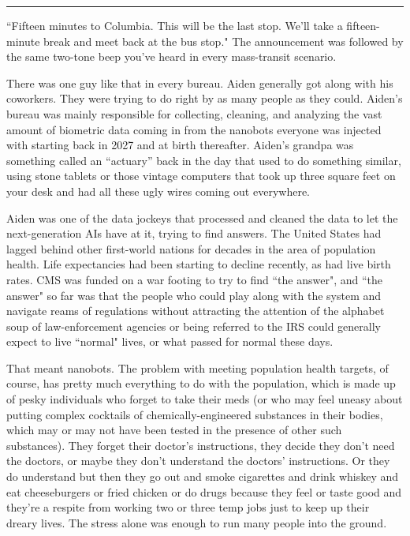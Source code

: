 \documentclass[11pt]{book}
\begin{document}
	\vspace{0.5cm}
	\hrule
	\vspace{0.5cm}
	
	``Fifteen minutes to Columbia. This will be the last stop. We'll take a fifteen-minute break and meet back at the bus stop." The announcement was followed by the same two-tone beep you've heard in every mass-transit scenario.
	
	There was one guy like that in every bureau. Aiden generally got along with his coworkers. They were trying to do right by as many people as they could. Aiden's bureau was mainly responsible for collecting, cleaning, and analyzing the vast amount of biometric data coming in from the nanobots everyone was injected with starting back in 2027 and at birth thereafter. Aiden's grandpa was something called an ``actuary'' back in the day that used to do something similar, using stone tablets or those vintage computers that took up three square feet on your desk and had all these ugly wires coming out everywhere.
	
	Aiden was one of the data jockeys that processed and cleaned the data to let the next-generation AIs have at it, trying to find answers. The United States had lagged behind other first-world nations for decades in the area of population health. Life expectancies had been starting to decline recently, as had live birth rates. CMS was funded on a war footing to try to find ``the answer", and ``the answer" so far was that the people who could play along with the system and navigate reams of regulations without attracting the attention of the alphabet soup of law-enforcement agencies or being referred to the IRS could generally expect to live ``normal" lives, or what passed for normal these days.
	
	That meant nanobots. The problem with meeting population health targets, of course, has pretty much everything to do with the population, which is made up of pesky individuals who forget to take their meds (or who may feel uneasy about putting complex cocktails of  chemically-engineered substances in their bodies, which may or may not have been tested in the presence of other such substances). They forget their doctor's instructions, they decide they don't need the doctors, or maybe they don't understand the doctors' instructions. Or they do understand but then they go out and smoke cigarettes and drink whiskey and eat cheeseburgers or fried chicken or do drugs because they feel or taste good and they're a respite from working two or three temp jobs just to keep up their dreary lives. The stress alone was enough to run many people into the ground.
	
\end{document}
